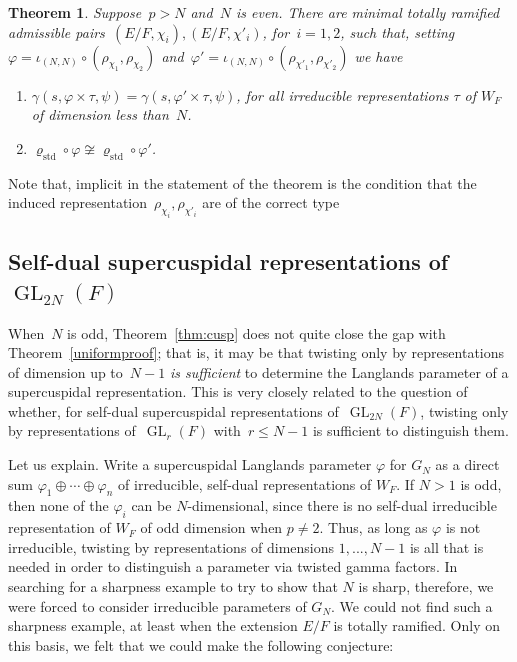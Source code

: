 \documentclass[12pt]{amsart}
\newcommand{\GL}{\operatorname{GL}}
\def\rhostd{\varrho_{\mathrm{std}}} %
\newtheorem{thm}{Theorem}[section]
\newtheorem{thm}[equation]{Theorem}
\begin{document}
\begin{thm}\label{thm:cuspeven}
Suppose~$p>N$ and~$N$ is even. There are minimal totally ramified admissible pairs~$(E/F,\chi_i),(E/F,\chi'_i)$, for~$i=1,2$, such that, setting~$\varphi=\iota_{(N,N)}\circ (\rho_{\chi_1},\rho_{\chi_2})$ and~$\varphi'=\iota_{(N,N)}\circ (\rho_{\chi'_1},\rho_{\chi'_2})$ we have
\begin{enumerate}
\item $\gamma(s, \varphi \times \tau, \psi) = \gamma(s, \varphi' \times \tau, \psi)$, for all irreducible representations $\tau$ of $W_F$ of dimension less than~$N$.
\item $\rhostd\circ\varphi\not\cong\rhostd\circ\varphi'$.
\end{enumerate}
\end{thm}

Note that, implicit in the statement of the theorem is the condition that the induced representation~$\rho_{\chi_i},\rho_{\chi'_i}$ are of the correct type
\fi

\subsection{Self-dual supercuspidal representations of~$\GL_{2N}(F)$}

When~$N$ is odd, Theorem~\ref{thm:cusp} does not quite close the gap with Theorem~\ref{uniformproof}; that is, it may be that twisting only by representations of dimension up to~$N-1$ \emph{is sufficient} to determine the Langlands parameter of a supercuspidal representation. This is very closely related to the question of whether, for self-dual supercuspidal representations of~$\GL_{2N}(F)$, twisting only by representations of~$\GL_r(F)$ with~$r\le N-1$ is sufficient to distinguish them. 

Let us explain. Write a supercuspidal Langlands parameter $\varphi$ for $G_N$ as a direct sum $\varphi_1 \oplus \cdots \oplus \varphi_n$ of irreducible, self-dual representations of $W_F$.  If $N>1$ is odd, then none of the $\varphi_i$ can be $N$-dimensional, since there is no self-dual irreducible representation of $W_F$ of odd dimension when $p \neq 2$.  Thus, as long as $\varphi$ is not irreducible, twisting by representations of dimensions $1, ..., N-1$ is all that is needed in order to distinguish a parameter via twisted gamma factors.  In searching for a sharpness example to try to show that $N$ is sharp, therefore, we were forced to consider irreducible parameters of $G_N$.  We could not find such a sharpness example, at least when the extension $E/F$ is totally ramified.  Only on this basis, we felt that we could make the following conjecture:
\end{document}
